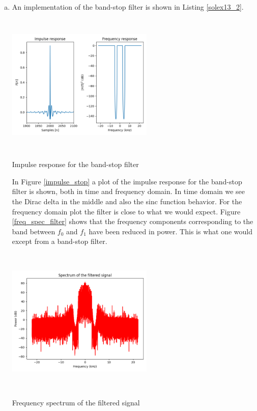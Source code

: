 \begin{enumerate}
\begin{enumerate}[a)]
\item An implementation of the band-stop filter is shown in Listing \ref{solex13_2}.


\begin{marginfigure}
\includegraphics[width=7.0cm,height=6.8cm]{ch13/figures/impulse_response.png}
\caption{Impulse response for the band-stop filter}
\label{impulse_stop}
\end{marginfigure}

In Figure \ref{impulse_stop} a plot of the impulse response for the band-stop filter is shown, both in time and frequency domain. 
In time domain we see the Dirac delta in the middle and also the sinc function behavior. 
For the frequency domain plot the filter is close to what we would expect. Figure \ref{freq_spec_filter} shows that the 
frequency components corresponding to the band between $f_{0}$ and $f_{1}$ have been
reduced in power. This is what one would except from a band-stop filter.

\begin{marginfigure}
\includegraphics[width=7.0cm,height=7.0cm]{ch13/figures/freq_spec_filter.png}
\caption{Frequency spectrum of the filtered signal}
\label{freq_spec_filter}
\end{marginfigure}

\end{enumerate}
\end{enumerate}